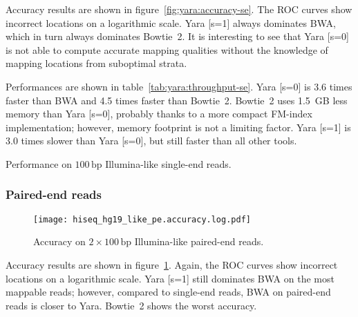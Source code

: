 Accuracy results are shown in figure~\ref{fig:yara:accuracy-se}.
The ROC curves show incorrect locations on a logarithmic scale.
Yara [s=1] always dominates BWA, which in turn always dominates Bowtie~2.
It is interesting to see that Yara [s=0] is not able to compute accurate mapping qualities without the knowledge of mapping locations from suboptimal strata.

Performances are shown in table~\ref{tab:yara:throughput-se}.
Yara [s=0] is 3.6 times faster than BWA and 4.5 times faster than Bowtie~2.
Bowtie~2 uses 1.5~GB less memory than Yara [s=0], probably thanks to a more compact FM-index implementation; however, memory footprint is not a limiting factor.
Yara [s=1] is 3.0 times slower than Yara [s=0], but still faster than all other tools.

\begin{table}[b]
\begin{center}
\caption[Yara performance on Illumina-like single-end reads]{Performance on $100\,\text{bp}$ Illumina-like single-end reads.}
\sffamily

\label{tab:yara:throughput-se}
\end{center}
\end{table}

\subsubsection{Paired-end reads}

\begin{figure}[t]
\begin{center}
\caption[Yara accuracy on Illumina-like paired-end reads]{Accuracy on $2 \times 100\,\text{bp}$ Illumina-like paired-end reads.}
\label{fig:yara:accuracy-pe}
\texttt{[image: hiseq\_hg19\_like\_pe.accuracy.log.pdf]}
\end{center} 
\end{figure}

Accuracy results are shown in figure~\ref{fig:yara:accuracy-pe}.
Again, the ROC curves show incorrect locations on a logarithmic scale.
Yara [s=1] still dominates BWA on the most mappable reads; however, compared to single-end reads, BWA on paired-end reads is closer to Yara.
Bowtie~2 shows the worst accuracy. 

